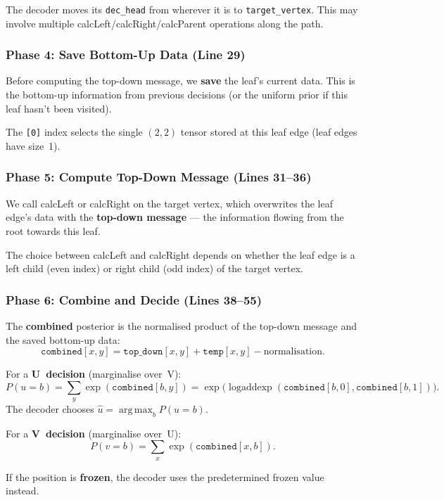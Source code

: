 \documentclass[11pt,a4paper]{article}
\newcommand{\logsumexp}{\operatorname{logaddexp}}
\DeclareMathOperator*{\argmax}{arg\,max}
\begin{document}
The decoder moves its \texttt{dec\_head} from wherever it is to \texttt{target\_vertex}. This may involve multiple calcLeft/calcRight/calcParent operations along the path.

\subsubsection{Phase 4: Save Bottom-Up Data (Line 29)}

Before computing the top-down message, we \textbf{save} the leaf's current data. This is the bottom-up information from previous decisions (or the uniform prior if this leaf hasn't been visited).

The \texttt{[0]} index selects the single $(2, 2)$ tensor stored at this leaf edge (leaf edges have size~1).

\subsubsection{Phase 5: Compute Top-Down Message (Lines 31--36)}

We call calcLeft or calcRight on the target vertex, which overwrites the leaf edge's data with the \textbf{top-down message} --- the information flowing from the root towards this leaf.

The choice between calcLeft and calcRight depends on whether the leaf edge is a left child (even index) or right child (odd index) of the target vertex.

\subsubsection{Phase 6: Combine and Decide (Lines 38--55)}

The \textbf{combined} posterior is the normalised product of the top-down message and the saved bottom-up data:
\[
\texttt{combined}[x, y] = \texttt{top\_down}[x, y] + \texttt{temp}[x, y] - \text{normalisation}.
\]

For a \textbf{U~decision} (marginalise over~V):
\[
P(u = b) = \sum_{y} \exp(\texttt{combined}[b, y]) = \exp\big(\logsumexp(\texttt{combined}[b, 0], \texttt{combined}[b, 1])\big).
\]
The decoder chooses $\hat{u} = \argmax_b P(u = b)$.

For a \textbf{V~decision} (marginalise over~U):
\[
P(v = b) = \sum_{x} \exp(\texttt{combined}[x, b]).
\]

If the position is \textbf{frozen}, the decoder uses the predetermined frozen value instead.
\end{document}
